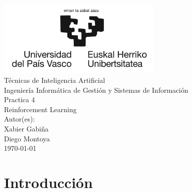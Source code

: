 \documentclass{report}
\begin{document}
  \begin{titlepage}
      \centering
      \includegraphics[width=0.6\textwidth]{./.img/logo.jpg}\\
      \vspace{1cm}
      \LARGE Técnicas de Inteligencia Artificial\\
      \vspace{0.5cm}
      \Large Ingeniería Informática de Gestión y Sistemas de Información\\
      \vspace{3cm}
      \Huge Practica 4\\
      \huge Reinforcement Learning\\
      \vspace{2.5cm}
      \Large Autor(es):\\
      \vspace{0.2cm}
      \large Xabier Gabiña\\
      \large Diego Montoya\\
      \vfill
      \today
  \end{titlepage}
  \tableofcontents
  \listoffigures
  \lstlistoflistings 
  \chapter{Introducción} %
\end{document}
